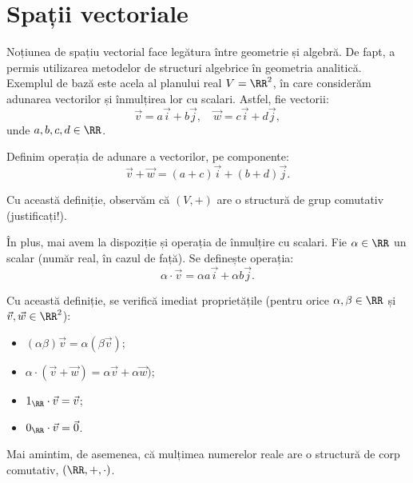 \section{Spații vectoriale}

Noțiunea de spațiu vectorial face legătura între geometrie și algebră. De fapt,
a permis utilizarea metodelor de structuri algebrice în geometria analitică.
Exemplul de bază este acela al planului real $ V = \RR^2 $, în care considerăm
adunarea vectorilor și înmulțirea lor cu scalari. Astfel, fie vectorii:
\[
    \vec{v} = a\vec{i} + b \vec{j}, \quad \vec{w} = c \vec{i} + d \vec{j},
\]
unde $ a, b, c, d \in \RR $.

Definim operația de adunare a vectorilor, pe componente:
\[
    \vec{v} + \vec{w} = (a + c)\vec{i} + (b + d) \vec{j}.
\]

Cu această definiție, observăm că $ (V, +) $ are o structură de grup comutativ
(justificați!).

În plus, mai avem la dispoziție și operația de înmulțire cu scalari. Fie $ \alpha \in \RR $
un scalar (număr real, în cazul de față). Se definește operația:
\[
    \alpha \cdot \vec{v} = \alpha a \vec{i} + \alpha b \vec{j}.
\]

Cu această definiție, se verifică imediat proprietățile (pentru orice $ \alpha, \beta \in \RR $
și $ \vec{v}, \vec{w} \in \RR^2 $):
\begin{itemize}
    \item $ (\alpha \beta)\vec{v} = \alpha (\beta \vec{v}) $;
    \item $ \alpha \cdot (\vec{v} + \vec{w}) = \alpha \vec{v} + \alpha \vec{w}) $;
    \item $ 1_\RR \cdot \vec{v} = \vec{v} $;
    \item $ 0_\RR \cdot \vec{v} = \vec{0} $.
\end{itemize}

Mai amintim, de asemenea, că mulțimea numerelor reale are o structură de corp comutativ,
$ (\RR, +, \cdot) $.

